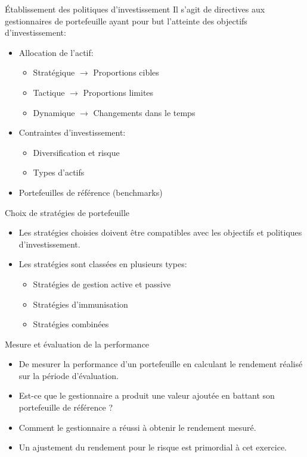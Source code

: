 \documentclass{beamer}
\begin{document}
\begin{frame}{Établissement des politiques d’investissement}
Il s’agit de directives aux gestionnaires de portefeuille ayant pour but l’atteinte des objectifs d’investissement:

\begin{itemize}[label=\bullet]
\item Allocation de l’actif:
\begin{itemize}[label=-]
\item Stratégique $\rightarrow$ Proportions cibles
\item Tactique $\rightarrow$ Proportions limites
\item Dynamique $\rightarrow$ Changements dans le temps
\end{itemize}
\item Contraintes d’investissement:
\begin{itemize}[label=-]
\item Diversification et risque
\item Types d’actifs
\end{itemize}
\item Portefeuilles de référence (benchmarks)
\end{itemize}
\end{frame}

\begin{frame}{Choix de stratégies de portefeuille}

\begin{itemize}[label=\bullet]
\item Les stratégies choisies doivent être compatibles avec les objectifs et politiques d’investissement.

\item Les stratégies sont classées en plusieurs types: 
\begin{itemize}[label=-]
\item Stratégies de gestion active et passive
\item Stratégies d’immunisation
\item Stratégies combinées
\end{itemize}
\end{itemize}
\end{frame}

\begin{frame}{Mesure et évaluation de la performance}
\begin{itemize}[label=\bullet]
\item De mesurer la performance d’un portefeuille en calculant le rendement réalisé sur la période d’évaluation.
\item Est-ce que le gestionnaire a produit une valeur ajoutée en battant son portefeuille de référence ?
\item Comment le gestionnaire a réussi à obtenir le rendement mesuré.  
\item Un ajustement du rendement pour le risque est primordial à cet exercice.  
\end{itemize}
\end{frame}
\end{document}
